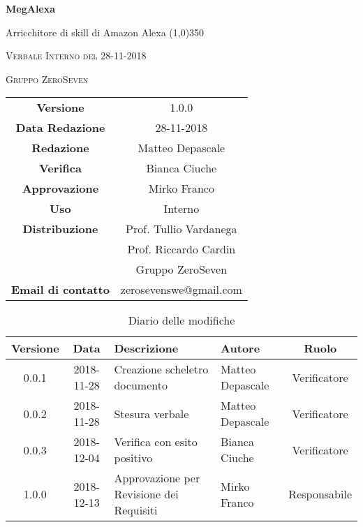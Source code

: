 \documentclass[a4paper,12pt]{article}
\author{Matteo Depascale}
\date{29-11-2018}
\begin{document}
\begin{titlepage}
	\centering
	{\huge\bfseries MegAlexa\par}
	Arricchitore di skill di Amazon Alexa
	\line(1,0){350} \\
	{\scshape\LARGE Verbale Interno del 28-11-2018 \par}
	\vspace{1cm}
	{\scshape Gruppo ZeroSeven \par}
	\logo
	\begin{tabular}{c|c}
		{\hfill \textbf{Versione}} 			& 1.0.0				\\
		{\hfill\textbf{Data Redazione}} 	& 28-11-2018		\\ 
		{\hfill\textbf{Redazione}} 			&  		Matteo Depascale			\\ 
		{\hfill\textbf{Verifica}} 				&  		Bianca Ciuche		\\ 
		{\hfill\textbf{Approvazione}} 		&  		Mirko Franco	\\ 
		{\hfill\textbf{Uso}} 					& 	Interno	\\ 
		{\hfill\textbf{Distribuzione}} 			& 			Prof. Tullio Vardanega \\ & Prof. Riccardo Cardin \\ & Gruppo ZeroSeven		\\ 
		{\hfill\textbf{Email di contatto}} & zerosevenswe@gmail.com \\
	\end{tabular}
\end{titlepage}
	

	
	\label{LastFrontPage}
	

	\newpage
	\cleardoublepage
		\begin{table}[tbph]
		\centering
		\begin{tabularx}{\textwidth}{|c|c|X|X|c|}
			\hline
			\textbf{Versione} & \textbf{Data} & \textbf{Descrizione} & \textbf{Autore} & \textbf{Ruolo} \\
			\hline
			0.0.1 & 2018-11-28 & Creazione scheletro documento
			& Matteo Depascale & Verificatore\\
			\hline
			0.0.2 & 2018-11-28 & Stesura verbale & Matteo Depascale & Verificatore \\
			\hline
			0.0.3 & 2018-12-04 & Verifica con esito positivo
			& Bianca Ciuche & Verificatore \\
			\hline
			1.0.0 & 2018-12-13 & 
			Approvazione per Revisione dei Requisiti
			& Mirko Franco &  Responsabile \\
			\hline
		\end{tabularx}
		\caption{Diario delle modifiche}
	\end{table}
	
\end{document}
